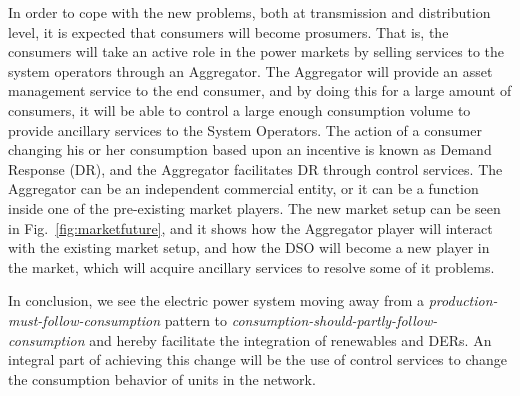 In order to cope with the new problems, both at transmission and distribution level, it is expected that consumers will become prosumers. That is, the consumers will take an active role in the power markets by selling services to the system operators through an Aggregator. The Aggregator will provide an asset management service to the end consumer, and by doing this for a large amount of consumers, it will be able to control a large enough consumption volume to provide ancillary services to the System Operators. The action of a consumer changing his or her consumption based upon an incentive is known as Demand Response (DR), and the Aggregator facilitates DR through control services. The Aggregator can be an independent commercial entity, or it can be a function inside one of the pre-existing market players. The new market setup can be seen in Fig.~\ref{fig:marketfuture}, and it shows how the Aggregator player will interact with the existing market setup, and how the DSO will become a new player in the market, which will acquire ancillary services to resolve some of it problems.

In conclusion, we see the electric power system moving away from a \emph{production-must-follow-consumption} pattern to \emph{consumption-should-partly-follow-consumption} and hereby facilitate the integration of renewables and DERs. An integral part of achieving this change will be the use of control services to change the consumption behavior of units in the network.
